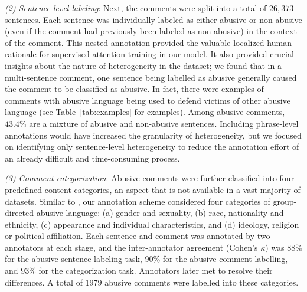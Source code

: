 \documentclass[letterpaper]{article}
\begin{document}
\textit{(2) Sentence-level labeling}: Next, the comments were split into a total of $26,373$ sentences. Each sentence was individually labeled as either abusive or non-abusive (even if the comment had previously been labeled as non-abusive) in the context of the comment. This nested annotation provided the valuable localized human rationale for supervised attention training in our model.
It also provided crucial insights about the nature of heterogeneity in the dataset; we found that in a multi-sentence comment, one sentence being labelled as abusive generally caused the  comment to be classified as abusive.
In fact, there were examples of comments with abusive language being used to defend victims of other abusive language (see Table~\ref{tab:examples} for examples). Among abusive comments, $43.4\%$ are a mixture of abusive and non-abusive sentences.
Including phrase-level annotations would have increased the granularity of heterogeneity, but we focused on identifying only sentence-level heterogeneity to reduce the annotation effort of an already difficult and time-consuming process.

\textit{(3) Comment categorization}: Abusive comments were further classified into four predefined  content categories, an aspect that is not available in a vast majority of  datasets.  Similar to \cite{founta2018large}, our annotation scheme considered four categories of group-directed abusive language: (a) gender and sexuality, (b) race, nationality and ethnicity, (c) appearance and individual characteristics, and (d) ideology, religion or political affiliation.
Each sentence and comment was annotated by two annotators at each stage, and the inter-annotator agreement (Cohen's $\kappa$) was $88\%$ for the abusive sentence labeling task, $90\%$ for the abusive comment labelling, and $93\%$ for the categorization task. Annotators later met to resolve their differences. A total of $1979$ abusive comments were labelled into these categories.
\end{document}
